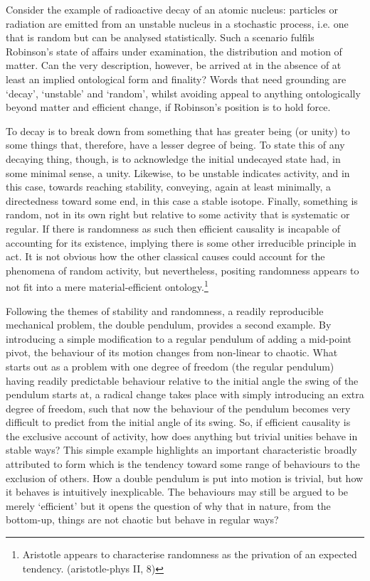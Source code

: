 Consider the example of radioactive decay of an atomic nucleus: particles or radiation are emitted from an unstable nucleus in a stochastic process, i.e. one that is random but can be analysed statistically. Such a scenario fulfils Robinson's state of affairs under examination, the distribution and motion of matter. Can the very description, however, be arrived at in the absence of at least an implied ontological form and finality? Words that need grounding are `decay', `unstable' and `random', whilst avoiding appeal to anything ontologically beyond matter and efficient change, if Robinson's position is to hold force.

To decay is to break down from something that has greater being (or unity) to some things that, therefore, have a lesser degree of being. To state this of any decaying thing, though, is to acknowledge the initial undecayed state had, in some minimal sense, a unity. Likewise, to be unstable indicates activity, and in this case, towards reaching stability, conveying, again at least minimally, a directedness toward some end, in this case a stable isotope. Finally, something is random, not in its own right but relative to some activity that is systematic or regular. If there is randomness as such then efficient causality is incapable of accounting for its existence, implying there is some other irreducible principle in act. It is not obvious how the other classical causes could account for the phenomena of random activity, but nevertheless, positing randomness appears to not fit into a mere material-efficient ontology.\footnote{Aristotle appears to characterise randomness as the privation of an expected tendency. (\acrshort{aristotle-phys} II, 8)}

Following the themes of stability and randomness, a readily reproducible mechanical problem, the double pendulum, provides a second example. By introducing a simple modification to a regular pendulum of adding a mid-point pivot, the behaviour of its motion changes from non-linear to chaotic. What starts out as a problem with one degree of freedom (the regular pendulum) having readily predictable behaviour relative to the initial angle the swing of the pendulum starts at, a radical change takes place with simply introducing an extra degree of freedom, such that now the behaviour of the pendulum becomes very difficult to predict from the initial angle of its swing. So, if efficient causality is the exclusive account of activity, how does anything but trivial unities behave in stable ways? This simple example highlights an important characteristic broadly attributed to form which is the tendency toward some range of behaviours to the exclusion of others. How a double pendulum is put into motion is trivial, but how it behaves is intuitively inexplicable. The behaviours may still be argued to be merely `efficient' but it opens the question of why that in nature, from the bottom-up, things are not chaotic but behave in regular ways?

